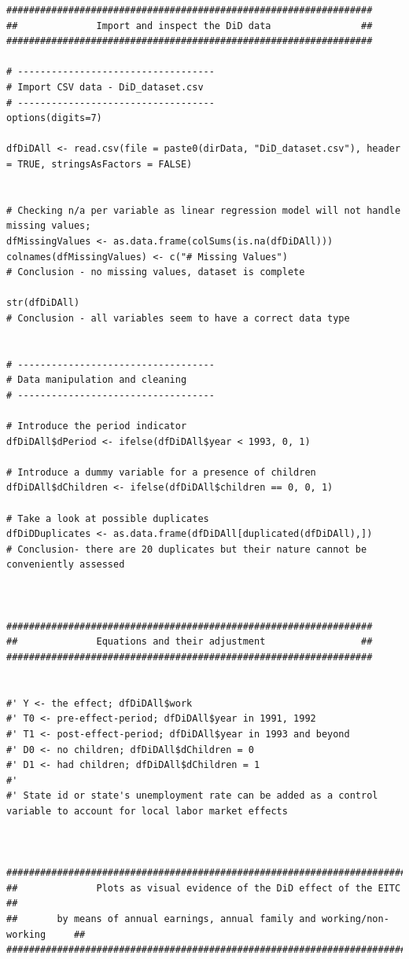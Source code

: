 \documentclass{article}
\begin{document}
\begin{tiny}
\begin{verbatim}
#################################################################
##              Import and inspect the DiD data                ##
#################################################################

# -----------------------------------
# Import CSV data - DiD_dataset.csv
# -----------------------------------
options(digits=7)

dfDiDAll <- read.csv(file = paste0(dirData, "DiD_dataset.csv"), header = TRUE, stringsAsFactors = FALSE)


# Checking n/a per variable as linear regression model will not handle missing values;
dfMissingValues <- as.data.frame(colSums(is.na(dfDiDAll)))
colnames(dfMissingValues) <- c("# Missing Values")
# Conclusion - no missing values, dataset is complete

str(dfDiDAll)
# Conclusion - all variables seem to have a correct data type


# -----------------------------------
# Data manipulation and cleaning
# -----------------------------------

# Introduce the period indicator
dfDiDAll$dPeriod <- ifelse(dfDiDAll$year < 1993, 0, 1)

# Introduce a dummy variable for a presence of children
dfDiDAll$dChildren <- ifelse(dfDiDAll$children == 0, 0, 1)

# Take a look at possible duplicates 
dfDiDDuplicates <- as.data.frame(dfDiDAll[duplicated(dfDiDAll),])
# Conclusion- there are 20 duplicates but their nature cannot be conveniently assessed



#################################################################
##              Equations and their adjustment                 ##
#################################################################


#' Y <- the effect; dfDiDAll$work
#' T0 <- pre-effect-period; dfDiDAll$year in 1991, 1992
#' T1 <- post-effect-period; dfDiDAll$year in 1993 and beyond
#' D0 <- no children; dfDiDAll$dChildren = 0
#' D1 <- had children; dfDiDAll$dChildren = 1
#' 
#' State id or state's unemployment rate can be added as a control variable to account for local labor market effects



##################################################################################
##              Plots as visual evidence of the DiD effect of the EITC          ##
##       by means of annual earnings, annual family and working/non-working     ##
##################################################################################


\end{verbatim}
\end{tiny}
\end{document}
